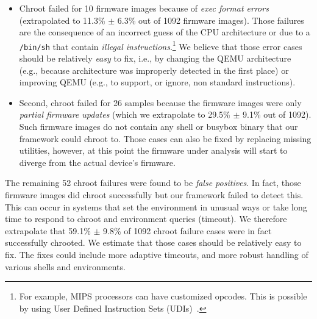 \documentclass[conference]{./templates/ndss/IEEEtran}
\newcounter{t0d0_counter}
\newcounter{pr00f_counter}
\newcommand{\CountFirmwareEmulatedNOTOK}{1092}
\newcommand{\EmulatedNOTOKRandSamplChrootDetectFail}{52}
\newcommand{\EmulatedNOTOKRandSamplChrootDetectFailPct}{59.1\%}
\newcommand{\EmulatedNOTOKRandSamplChrootDetectFailConfInt}{9.8\%}
\newcommand{\EmulatedNOTOKRandSamplChrootFailExecFormat}{10}
\newcommand{\EmulatedNOTOKRandSamplChrootFailExecFormatPct}{11.3\%}
\newcommand{\EmulatedNOTOKRandSamplChrootFailExecFormatConfInt}{6.3\%}
\newcommand{\EmulatedNOTOKRandSamplChrootFailFS}{26}
\newcommand{\EmulatedNOTOKRandSamplChrootFailFSPct}{29.5\%}
\newcommand{\EmulatedNOTOKRandSamplChrootFailFSConfInt}{9.1\%}
\begin{document}
\begin{itemize}

\item Chroot failed for \EmulatedNOTOKRandSamplChrootFailExecFormat{} 
firmware images because of \emph{exec format errors} (extrapolated 
to \EmulatedNOTOKRandSamplChrootFailExecFormatPct{} $\pm$ 
\EmulatedNOTOKRandSamplChrootFailExecFormatConfInt{} out 
of \CountFirmwareEmulatedNOTOK{} firmware images). 
Those failures are the consequence of an incorrect guess of the CPU architecture or 
due to a \texttt{/bin/sh} that contain \emph{illegal instructions}.\footnote{
For example, MIPS processors can have customized opcodes. This is possible 
by using User Defined Instruction Sets (UDIs)~\cite{ienne2006customizable}.}
We believe that those error cases should be relatively \emph{easy} to fix, 
i.e., by changing the QEMU architecture (e.g., because architecture was improperly 
detected in the first place) or improving QEMU (e.g., to support, or ignore, non standard instructions). 

\item  Second, chroot failed for \EmulatedNOTOKRandSamplChrootFailFS{} 
samples because the firmware images were only \emph{partial firmware updates} 
(which we extrapolate to \EmulatedNOTOKRandSamplChrootFailFSPct{} $\pm$ 
\EmulatedNOTOKRandSamplChrootFailFSConfInt{} out of \CountFirmwareEmulatedNOTOK{}).
Such firmware images do not contain any shell or busybox binary that our framework 
could chroot to. 
Those cases can also be fixed by replacing missing utilities, however,
at this point the firmware under analysis will start to diverge from
the actual device's firmware.

\end{itemize}

    The remaining \EmulatedNOTOKRandSamplChrootDetectFail{}  chroot failures were 
found to be \emph{false positives}. In fact, those firmware images 
did  chroot successfully but our framework failed to detect this.
This can occur in systems that set the environment in unusual ways or 
take long time to respond to chroot and environment queries (timeout). 
We therefore extrapolate that \EmulatedNOTOKRandSamplChrootDetectFailPct{} $\pm$ 
\EmulatedNOTOKRandSamplChrootDetectFailConfInt{} of \CountFirmwareEmulatedNOTOK{} 
chroot failure cases were in fact successfully chrooted. 
We estimate that those cases should be relatively easy to fix. The fixes could include more 
adaptive timeouts, and more robust handling of various shells and 
environments. 
\end{document}
